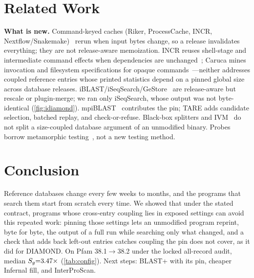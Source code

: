 \documentclass[letterpaper,twocolumn,10pt]{article}
\theoremstyle{definition}
\newcommand{\sys}{TARE\xspace}
\newcommand{\sys}{PARE\xspace}
\begin{document}
\section{Related Work}
\label{sec:related}



\textbf{What is new.} Command\nobreakdash-keyed caches (Riker, ProcessCache, INCR, Nextflow/Snakemake)~\cite{curtsinger2022riker,shiptoski2023processcache,xie2026incr,ditommaso2017nextflow,molder2021snakemake}
rerun when input bytes change, so a release invalidates everything; they are not release\nobreakdash-aware memoization.
INCR reuses shell\nobreakdash-stage and intermediate command effects when dependencies are unchanged~\cite{xie2026incr}; Caruca mines
invocation and filesystem specifications for opaque commands~\cite{lamprou2025caruca}---neither addresses coupled reference
entries whose printed statistics depend on a pinned global size across database releases.
iBLAST/iSeqSearch/GeStore~\cite{dash2021iblast,yoo2025iseqsearch,pedersen2014gestore} are release\nobreakdash-aware but rescale or
plugin\nobreakdash-merge; we ran only iSeqSearch, whose output was not byte\nobreakdash-identical (\cref{fig:idiamond}). mpiBLAST~\cite{darling2003mpiblast} contributes the pin;
\sys adds candidate selection, batched replay, and check\nobreakdash-or\nobreakdash-refuse. Black\nobreakdash-box splitters and IVM~\cite{shen2022kumquat,vasilakis2021pash,blakeley1986views,acar2003selective}
do not split a size\nobreakdash-coupled database argument of an unmodified binary. Probes borrow metamorphic testing~\cite{chen1998metamorphic,segura2016survey}, not a new testing method.


\section{Conclusion}
\label{sec:conclusion}

Reference databases change every few weeks to months, and the programs that search them start from scratch every time. We
showed that under the stated contract, programs whose cross\nobreakdash-entry coupling lies in exposed settings can avoid this repeated work: pinning
those settings lets an unmodified program reprint, byte for byte, the output of a full run while searching only what
changed, and a check that adds back left\nobreakdash-out entries catches coupling the pin does not cover, as it did for DIAMOND.
On Pfam 38.1$\rightarrow$38.2 under the locked all\nobreakdash-record audit, median $S_g{=}3.47\times$
(\cref{tab:config}). Next steps: BLAST+ with its pin, cheaper Infernal fill, and InterProScan.
\end{document}
